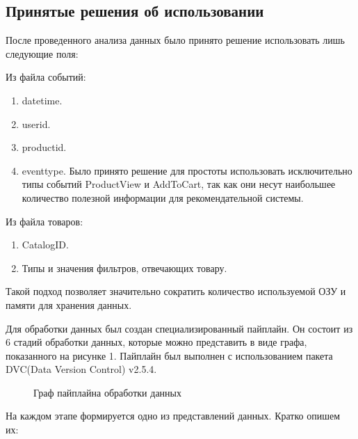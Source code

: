 \documentclass[14pt]{mmcs_article}
\newenvironment{myenumerate}
{ \begin{enumerate}
		\setlength{\itemsep}{0pt}
		\setlength{\parskip}{0pt}
		\setlength{\parsep}{0pt}     }
	{ \end{enumerate}                  }
\begin{document}
\subsection{Принятые решения об использовании}

После проведенного анализа данных было принято решение использовать лишь следующие поля:

Из файла событий:

\begin{myenumerate}
		\item datetime.
		\item userid. 
		\item productid.
		\item eventtype. Было принято решение для простоты использовать исключительно типы событий ProductView и AddToCart, так как они несут наибольшее количество полезной информации для рекомендательной системы. 
\end{myenumerate}

Из файла товаров:

\begin{myenumerate}
	\item CatalogID.
	\item Типы и значения фильтров, отвечающих товару.
\end{myenumerate}

Такой подход позволяет значительно сократить количество используемой ОЗУ и памяти для хранения данных.

Для обработки данных был создан специализированный пайплайн. Он состоит из 6 стадий обработки данных, которые можно представить в виде графа, показанного на рисунке 1. Пайплайн был выполнен с использованием пакета DVC(Data Version Control) v2.5.4.

\begin{figure}[H]
\caption{Граф пайплайна обработки данных}\label{stud:fig:2}
\end{figure}
На каждом этапе формируется одно из представлений данных. Кратко опишем их:
\end{document}

